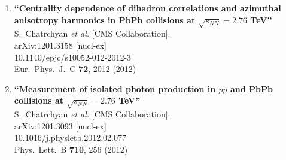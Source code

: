 \documentclass{article}
\begin{document}
\begin{enumerate}
\item%
{\bf ``Centrality dependence of dihadron correlations and azimuthal anisotropy harmonics in PbPb collisions at $\sqrt{s_{NN}}=2.76$ TeV''}
  \\{}S.~Chatrchyan {\it et al.}  [CMS Collaboration].
  \\{}arXiv:1201.3158 [nucl-ex]
    \\{}10.1140/epjc/s10052-012-2012-3
\\{}Eur.\ Phys.\ J.\ C {\bf 72}, 2012 (2012) %


\item%
{\bf ``Measurement of isolated photon production in $pp$ and PbPb collisions at $\sqrt{s_{NN}}=2.76$ TeV''}
  \\{}S.~Chatrchyan {\it et al.}  [CMS Collaboration].
  \\{}arXiv:1201.3093 [nucl-ex]
    \\{}10.1016/j.physletb.2012.02.077
\\{}Phys.\ Lett.\ B {\bf 710}, 256 (2012) %



\end{enumerate}
\end{document}
